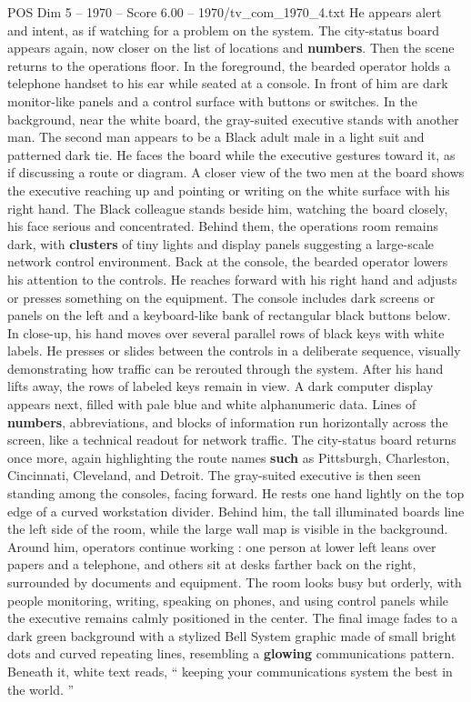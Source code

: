 \begin{textsample}{POS Dim 5 – 1970 – Score 6.00 – 1970/tv\_com\_1970\_4.txt}
He appears alert and intent, as if watching for a problem on the system.
The city-status board appears again, now closer on the list of locations and \textbf{numbers}.
Then the scene returns to the operations floor.
In the foreground, the bearded operator holds a telephone handset to his ear while seated at a console.
In front of him are dark monitor-like panels and a control surface with buttons or switches.
In the background, near the white board, the gray-suited executive stands with another man.
The second man appears to be a Black adult male in a light suit and patterned dark tie.
He faces the board while the executive gestures toward it, as if discussing a route or diagram.
A closer view of the two men at the board shows the executive reaching up and pointing or writing on the white surface with his right hand.
The Black colleague stands beside him, watching the board closely, his face serious and concentrated.
Behind them, the operations room remains dark, with \textbf{clusters} of tiny lights and display panels suggesting a large-scale network control environment.
Back at the console, the bearded operator lowers his attention to the controls.
He reaches forward with his right hand and adjusts or presses something on the equipment.
The console includes dark screens or panels on the left and a keyboard-like bank of rectangular black buttons below.
In close-up, his hand moves over several parallel rows of black keys with white labels.
He presses or slides between the controls in a deliberate sequence, visually demonstrating how traffic can be rerouted through the system.
After his hand lifts away, the rows of labeled keys remain in view.
A dark computer display appears next, filled with pale blue and white alphanumeric data.
Lines of \textbf{numbers}, abbreviations, and blocks of information run horizontally across the screen, like a technical readout for network traffic.
The city-status board returns once more, again highlighting the route names \textbf{such} as Pittsburgh, Charleston, Cincinnati, Cleveland, and Detroit.
The gray-suited executive is then seen standing among the consoles, facing forward.
He rests one hand lightly on the top edge of a curved workstation divider.
Behind him, the tall illuminated boards line the left side of the room, while the large wall map is visible in the background.
Around him, operators continue working : one person at lower left leans over papers and a telephone, and others sit at desks farther back on the right, surrounded by documents and equipment.
The room looks busy but orderly, with people monitoring, writing, speaking on phones, and using control panels while the executive remains calmly positioned in the center.
The final image fades to a dark green background with a stylized Bell System graphic made of small bright dots and curved repeating lines, resembling a \textbf{glowing} communications pattern.
Beneath it, white text reads, “ keeping your communications system the best in the world. ”

\end{textsample}
